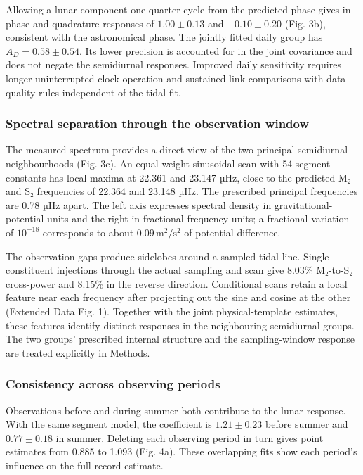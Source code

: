 \documentclass[
  10pt,
  a4paper,
]{article}
\begin{document}
Allowing a lunar component one quarter-cycle from the predicted phase
gives in-phase and quadrature responses of \(1.00\pm0.13\) and
\(-0.10\pm0.20\) (Fig. 3b), consistent with the astronomical phase. The
jointly fitted daily group has \(A_D=0.58\pm0.54\). Its lower precision
is accounted for in the joint covariance and does not negate the
semidiurnal responses. Improved daily sensitivity requires longer
uninterrupted clock operation and sustained link comparisons with
data-quality rules independent of the tidal fit.

\hypertarget{spectral-separation-through-the-observation-window}{%
\subsubsection{Spectral separation through the observation
window}\label{spectral-separation-through-the-observation-window}}

The measured spectrum provides a direct view of the two principal
semidiurnal neighbourhoods (Fig. 3c). An equal-weight sinusoidal scan
with 54 segment constants has local maxima at 22.361 and 23.147 µHz,
close to the predicted M₂ and S₂ frequencies of 22.364 and 23.148 µHz.
The prescribed principal frequencies are 0.78 µHz apart. The left axis
expresses spectral density in gravitational-potential units and the
right in fractional-frequency units; a fractional variation of
\(10^{-18}\) corresponds to about \(0.09\,\mathrm{m^2/s^2}\) of
potential difference.

The observation gaps produce sidelobes around a sampled tidal line.
Single-constituent injections through the actual sampling and scan give
8.03\% M₂-to-S₂ cross-power and 8.15\% in the reverse direction.
Conditional scans retain a local feature near each frequency after
projecting out the sine and cosine at the other (Extended Data Fig. 1).
Together with the joint physical-template estimates, these features
identify distinct responses in the neighbouring semidiurnal groups. The
two groups' prescribed internal structure and the sampling-window
response are treated explicitly in Methods.

\hypertarget{consistency-across-observing-periods}{%
\subsubsection{Consistency across observing
periods}\label{consistency-across-observing-periods}}

Observations before and during summer both contribute to the lunar
response. With the same segment model, the coefficient is
\(1.21\pm0.23\) before summer and \(0.77\pm0.18\) in summer. Deleting
each observing period in turn gives point estimates from 0.885 to 1.093
(Fig. 4a). These overlapping fits show each period's influence on the
full-record estimate.
\end{document}

